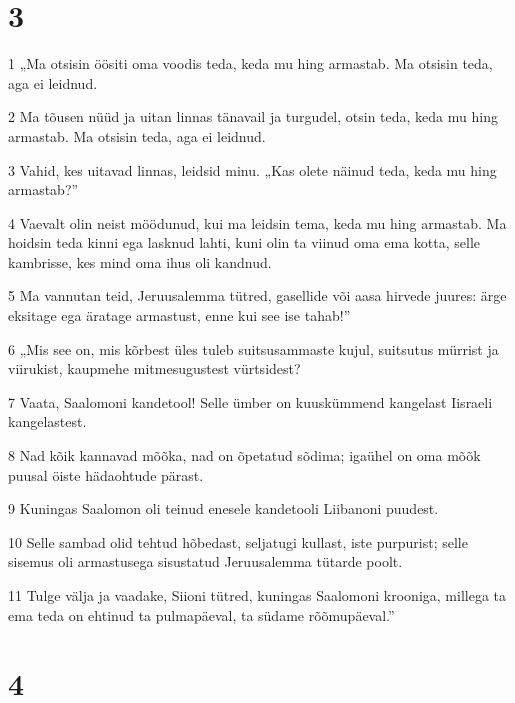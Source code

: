 \chapter{3}

\par 1 „Ma otsisin öösiti oma voodis teda, keda mu hing armastab. Ma otsisin teda, aga ei leidnud.
\par 2 Ma tõusen nüüd ja uitan linnas tänavail ja turgudel, otsin teda, keda mu hing armastab. Ma otsisin teda, aga ei leidnud.
\par 3 Vahid, kes uitavad linnas, leidsid minu. „Kas olete näinud teda, keda mu hing armastab?”
\par 4 Vaevalt olin neist möödunud, kui ma leidsin tema, keda mu hing armastab. Ma hoidsin teda kinni ega lasknud lahti, kuni olin ta viinud oma ema kotta, selle kambrisse, kes mind oma ihus oli kandnud.
\par 5 Ma vannutan teid, Jeruusalemma tütred, gasellide või aasa hirvede juures: ärge eksitage ega äratage armastust, enne kui see ise tahab!”
\par 6 „Mis see on, mis kõrbest üles tuleb suitsusammaste kujul, suitsutus mürrist ja viirukist, kaupmehe mitmesugustest vürtsidest?
\par 7 Vaata, Saalomoni kandetool! Selle ümber on kuuskümmend kangelast Iisraeli kangelastest.
\par 8 Nad kõik kannavad mõõka, nad on õpetatud sõdima; igaühel on oma mõõk puusal öiste hädaohtude pärast.
\par 9 Kuningas Saalomon oli teinud enesele kandetooli Liibanoni puudest.
\par 10 Selle sambad olid tehtud hõbedast, seljatugi kullast, iste purpurist; selle sisemus oli armastusega sisustatud Jeruusalemma tütarde poolt.
\par 11 Tulge välja ja vaadake, Siioni tütred, kuningas Saalomoni krooniga, millega ta ema teda on ehtinud ta pulmapäeval, ta südame rõõmupäeval.”

\chapter{4}

